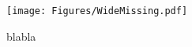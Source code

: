 {
\begin{figure*}
\begin{center}
\centerline{\texttt{[image: Figures/WideMissing.pdf]}}
{
blabla
}
\end{center}
\end{figure*}
}
